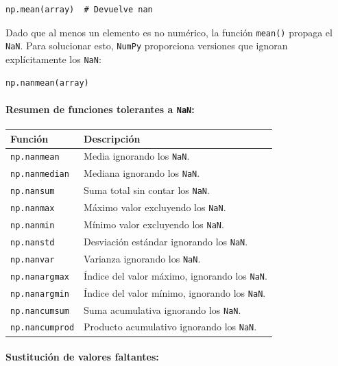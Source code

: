 \documentclass{article}
\theoremstyle{nonumberplain}
\begin{document}
\begin{verbatim}
np.mean(array)  # Devuelve nan
\end{verbatim}

Dado que al menos un elemento es no numérico, la función \texttt{mean()} propaga el \texttt{NaN}. Para solucionar esto, \texttt{NumPy} proporciona versiones que ignoran explícitamente los \texttt{NaN}:

\begin{verbatim}
np.nanmean(array)
\end{verbatim}

\paragraph{Resumen de funciones tolerantes a \texttt{NaN}:}

\begin{center}
\renewcommand{\arraystretch}{1.25}
\begin{longtable}{|p{4cm}|p{11cm}|}
\hline
\textbf{Función} & \textbf{Descripción} \\
\hline
\texttt{np.nanmean} & Media ignorando los \texttt{NaN}. \\
\texttt{np.nanmedian} & Mediana ignorando los \texttt{NaN}. \\
\texttt{np.nansum} & Suma total sin contar los \texttt{NaN}. \\
\texttt{np.nanmax} & Máximo valor excluyendo los \texttt{NaN}. \\
\texttt{np.nanmin} & Mínimo valor excluyendo los \texttt{NaN}. \\
\texttt{np.nanstd} & Desviación estándar ignorando los \texttt{NaN}. \\
\texttt{np.nanvar} & Varianza ignorando los \texttt{NaN}. \\
\texttt{np.nanargmax} & Índice del valor máximo, ignorando los \texttt{NaN}. \\
\texttt{np.nanargmin} & Índice del valor mínimo, ignorando los \texttt{NaN}. \\
\texttt{np.nancumsum} & Suma acumulativa ignorando los \texttt{NaN}. \\
\texttt{np.nancumprod} & Producto acumulativo ignorando los \texttt{NaN}. \\
\hline
\end{longtable}
\end{center}

\paragraph{Sustitución de valores faltantes:}
\end{document}

